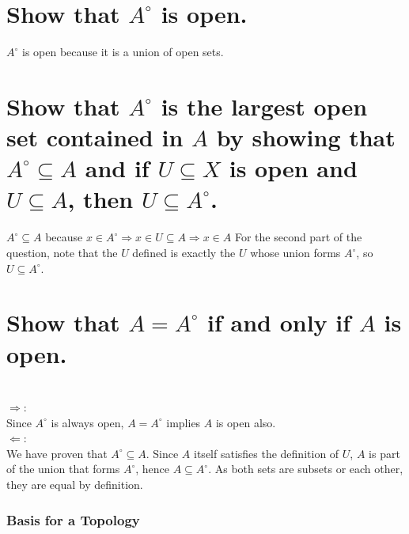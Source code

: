 
\begin{parts}
 \part{Show that $A^\circ$ is open.}
 
\begin{solution}
 $A^\circ$ is open because it is a union of open sets.
\end{solution}

\part{Show that $A^\circ$ is the largest open set contained in $A$ by showing that $A^\circ \subseteq A$ and if $U \subseteq X$ is open and $U \subseteq A$, then $U \subseteq A^\circ$.}

\begin{solution}
 $A^\circ \subseteq A$ because $x \in A^\circ \Rightarrow x \in U \subseteq A \Rightarrow x \in A$ For the second part of the question, note that the $U$ defined is exactly the $U$ whose union forms $A^\circ$, so $U \subseteq A^\circ$. \\
\end{solution}

\part{Show that $A = A^\circ$ if and only if $A$ is open.}

\begin{solution}
 \\$\Rightarrow$: \\
 Since $A^\circ$ is always open, $A = A^\circ$ implies $A$ is open also. \\
 $\Leftarrow$: \\
 We have proven that $A^\circ \subseteq A$. Since $A$ itself satisfies the definition of $U$, $A$ is part of the union that forms $A^\circ$, hence $A \subseteq A^\circ$. As both sets are subsets or each other, they are equal by definition.
\end{solution}
\end{parts}

\section{Basis for a Topology}

